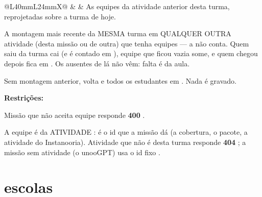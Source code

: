\begin{tabularx}{\linewidth}{@{}L{40mm}L{24mm}X@{}}
\zebra {} &  & As equipes da atividade anterior desta turma, reprojetadas sobre a turma de hoje.\par A montagem mais recente da MESMA turma em QUALQUER OUTRA atividade (desta missão ou de outra) que tenha equipes --- a  não conta. Quem saiu da turma cai (e é contado em ), equipe que ficou vazia some, e quem chegou depois fica em . Os ausentes de lá não vêm: falta é da aula.\par Sem montagem anterior,  volta  e todos os estudantes em . Nada é gravado.\par \textbf{Restrições:}\par \hspace*{1em}\textbullet{} Missão que não aceita equipe responde \textbf{400} .\par \hspace*{1em}\textbullet{} A equipe é da ATIVIDADE :  é o id que a missão dá (a cobertura, o pacote, a atividade do Instanooria). Atividade que não é desta turma responde \textbf{404} ; a missão sem atividade (o unooGPT) usa o id fixo .\\
\bottomrule
\end{tabularx}

\section{escolas}

